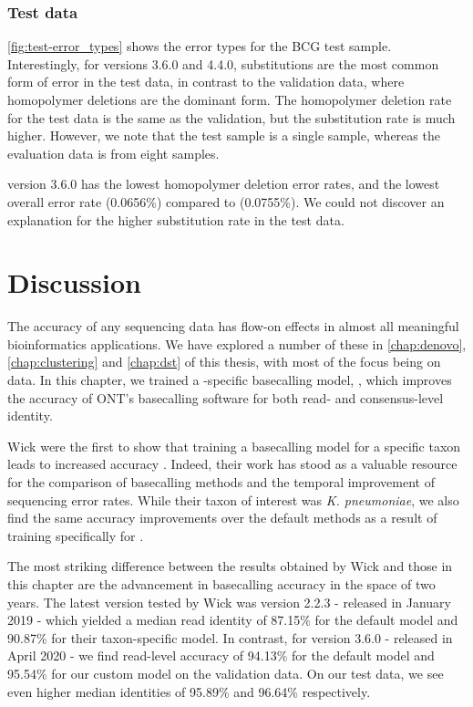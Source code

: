 \subsubsection{Test data}

\autoref{fig:test-error_types} shows the error types for the BCG test sample. Interestingly, for versions 3.6.0 and 4.4.0, substitutions are the most common form of error in the test data, in contrast to the validation data, where homopolymer deletions are the dominant form. The homopolymer deletion rate for the test data is the same as the validation, but the substitution rate is much higher. However, we note that the test sample is a single sample, whereas the evaluation data is from eight samples.

\tubby{} version 3.6.0 has the lowest homopolymer deletion error rates, and the lowest overall error rate (0.0656\%) compared to \guppy{} (0.0755\%). We could not discover an explanation for the higher substitution rate in the test data.

\section{Discussion}

The accuracy of any sequencing data has flow-on effects in almost all meaningful bioinformatics applications. We have explored a number of these in \autoref{chap:denovo}, \autoref{chap:clustering} and \autoref{chap:dst} of this thesis, with most of the focus being on \ont{} data. In this chapter, we trained a \mtb{}-specific \ont{} basecalling model, \tubby{}, which improves the accuracy of ONT's basecalling software \guppy{} for both read- and consensus-level identity.

Wick \etal{} were the first to show that training a \ont{} basecalling model for a specific taxon leads to increased accuracy \cite{wick2019}. Indeed, their work has stood as a valuable resource for the comparison of basecalling methods and the temporal improvement of \ont{} sequencing error rates. While their taxon of interest  was \textit{K. pneumoniae}, we also find the same accuracy improvements over the default methods as a result of training specifically for \mtb{}.

The most striking difference between the results obtained by Wick \etal{} and those in this chapter are the advancement in basecalling accuracy in the space of two years. The latest \guppy{} version tested by Wick \etal{} was version 2.2.3 - released in January 2019 - which yielded a median read identity of 87.15\% for the default model and 90.87\% for their taxon-specific model. In contrast, for \guppy{} version 3.6.0 - released in April 2020 - we find read-level accuracy of 94.13\% for the default model and 95.54\% for our custom \tubby{} model on the validation data. On our test data, we see even higher median identities of 95.89\% and 96.64\% respectively.

